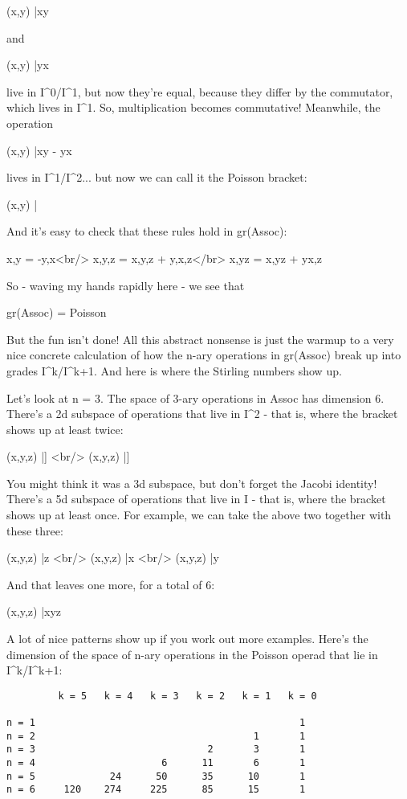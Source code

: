 (x,y) |\to  xy 

and

(x,y) |\to  yx

live in I^{0}/I^{1}, but now they're equal, because
they differ by the commutator, which lives in I^{1}.  So,
multiplication becomes commutative!  Meanwhile, the operation

(x,y) |\to  xy - yx

lives in I^{1}/I^{2}... but now we can call it the
Poisson bracket:

(x,y) |

And it's easy to check that these rules hold in gr(Assoc):

{x,y} = -{y,x}<br/>
{x,{y,z}} = {{x,y},z} + {y,{x,z}}</br>
{x,yz} = {x,y}z + y{x,z}

So - waving my hands rapidly here - we see that

gr(Assoc) = Poisson

But the fun isn't done!  All this abstract nonsense is just the warmup
to a very nice concrete calculation of how the n-ary operations in
gr(Assoc) break up into grades I^{k}/I^{k+1}.  And
here is where the Stirling numbers show up.

Let's look at n = 3.  The space of 3-ary operations in Assoc has
dimension 6.  There's a 2d subspace of operations that live in
I^{2} - that is, where the bracket shows up at least twice:

(x,y,z) |\to  [x,[y,z]] <br/>
(x,y,z) |\to  [y,[x,z]]

You might think it was a 3d subspace, but don't forget the Jacobi
identity!  There's a 5d subspace of operations that live in I - that
is, where the bracket shows up at least once.  For example, we can
take the above two together with these three:

(x,y,z) |\to  [x,y]z <br/>
(x,y,z) |\to  [y,z]x <br/>
(x,y,z) |\to  [x,z]y

And that leaves one more, for a total of 6:

(x,y,z) |\to  xyz

A lot of nice patterns show up if you work out more examples.  Here's
the dimension of the space of n-ary operations in the Poisson operad
that lie in I^{k}/I^{k+1}:
                               
\begin{verbatim}
         k = 5   k = 4   k = 3   k = 2   k = 1   k = 0
          
n = 1                                              1
n = 2                                      1       1
n = 3                              2       3       1
n = 4                      6      11       6       1
n = 5             24      50      35      10       1
n = 6     120    274     225      85      15       1
\end{verbatim}
    
